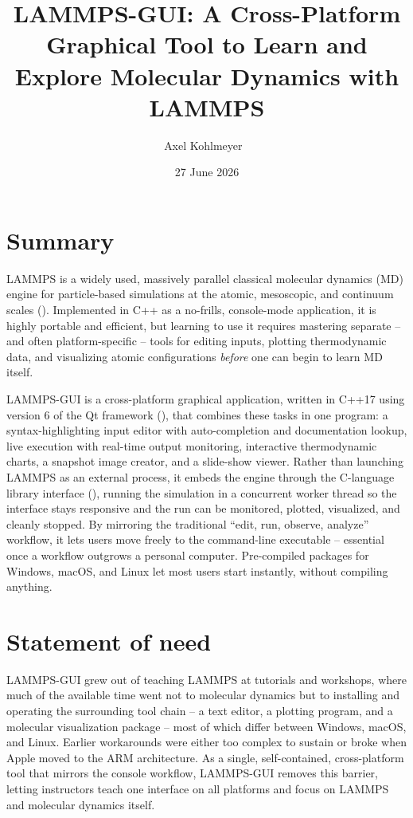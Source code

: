 \documentclass[
]{article}
\title{LAMMPS-GUI: A Cross-Platform Graphical Tool to Learn and Explore
Molecular Dynamics with LAMMPS}
\author[1%
  \ensuremath\mathparagraph]{Axel Kohlmeyer%
    \,\orcidlink{0000-0001-6204-6475}\,%
    }
\affil[1]{Institute for Computational Molecular Science, Temple
University, Philadelphia, PA, USA%
  }
\affil[$\mathparagraph$]{Corresponding author: %
}
\date{27 June 2026}
\begin{document}
\maketitle

\section{Summary}\label{summary}

LAMMPS is a widely used, massively parallel classical molecular dynamics
(MD) engine for particle-based simulations at the atomic, mesoscopic,
and continuum scales (). Implemented in C++ as a no-frills, console-mode application, it
is highly portable and efficient, but learning to use it requires
mastering separate -- and often platform-specific -- tools for editing
inputs, plotting thermodynamic data, and visualizing atomic
configurations \emph{before} one can begin to learn MD itself.

LAMMPS-GUI is a cross-platform graphical application, written in C++17
using version 6 of the Qt framework (), that combines these tasks in one program: a
syntax-highlighting input editor with auto-completion and documentation
lookup, live execution with real-time output monitoring, interactive
thermodynamic charts, a snapshot image creator, and a slide-show viewer.
Rather than launching LAMMPS as an external process, it embeds the
engine through the C-language library interface
(), running
the simulation in a concurrent worker thread so the interface stays
responsive and the run can be monitored, plotted, visualized, and
cleanly stopped. By mirroring the traditional ``edit, run, observe,
analyze'' workflow, it lets users move freely to the command-line
executable -- essential once a workflow outgrows a personal computer.
Pre-compiled packages for Windows, macOS, and Linux let most users start
instantly, without compiling anything.

\section{Statement of need}\label{statement-of-need}

LAMMPS-GUI grew out of teaching LAMMPS at tutorials and workshops, where
much of the available time went not to molecular dynamics but to
installing and operating the surrounding tool chain -- a text editor, a
plotting program, and a molecular visualization package -- most of which
differ between Windows, macOS, and Linux. Earlier workarounds were
either too complex to sustain or broke when Apple moved to the ARM
architecture. As a single, self-contained, cross-platform tool that
mirrors the console workflow, LAMMPS-GUI removes this barrier, letting
instructors teach one interface on all platforms and focus on LAMMPS and
molecular dynamics itself.
\end{document}
